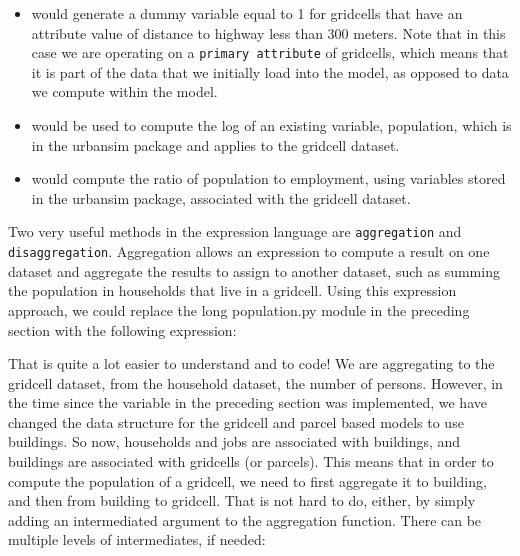 \begin{itemize}

\item {} would generate a dummy variable equal to 1 for gridcells that have an attribute value of distance to highway less than 300 meters.  Note that in this case we are operating on a \verb#primary attribute# of gridcells, which means that it is part of the data that we initially load into the model, as opposed to data we compute within the model.

\item {} would be used to compute the log of an existing variable, population, which is in the urbansim package and applies to the gridcell dataset.

\item {} would compute the ratio of population to employment, using variables stored in the urbansim package, associated with the gridcell dataset.  

\end{itemize}

Two very useful methods in the expression language are \verb#aggregation# and \verb#disaggregation#.  Aggregation allows an expression to compute a result on one dataset and aggregate the results to assign to another dataset, such as summing the population in households that live in a gridcell.  Using this expression approach, we could replace the long population.py module in the preceding section with the following expression:


That is quite a lot easier to understand and to code!  We are aggregating to the gridcell dataset, from the household dataset, the number of persons.  However, in the time since the variable in the preceding section was implemented, we have changed the data structure for the gridcell and parcel based models to use buildings.  So now, households and jobs are associated with buildings, and buildings are associated with gridcells (or parcels).  This means that in order to compute the population of a gridcell, we need to first aggregate it to building, and then from building to gridcell.  That is not hard to do, either, by simply adding an intermediated argument to the aggregation function.  There can be multiple levels of intermediates, if needed:


